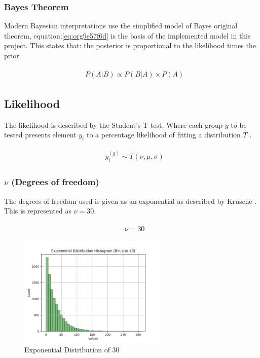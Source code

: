 \documentclass[11pt]{report}
\begin{document}
\subsubsection{Bayes Theorem}
\label{sec:orgf7b9113}

Modern Bayesian interpretations use the simplified model of Bayes original theorem, equation:\ref{eq:org9e57f6d} is the basis of the implemented model in this project. This states that: the posterior is proportional to the likelihood times the prior.

\begin{align}
\label{eq:org9e57f6d}
  &\begin{aligned}
  P(A|B) \propto P(B|A) \times P(A)
  \end{aligned}
\end{align}


\subsection{Likelihood}
\label{sec:org07bf29f}
The likelihood is described by the Student's T-test. Where each group \(g\) to be tested presents element \(y_i\) to a percentage likelihood of fitting a distribution \(T\) .

 \begin{align}
\label{eq:orgd0a9744}
   &\begin{aligned}
y_i^{(g)} \sim T(\nu, \mu, \sigma)
   \end{aligned}
 \end{align}

\subsubsection{\(\nu\) (Degrees of freedom)}
\label{sec:org0513a5e}
The degrees of freedom used is given as an exponential as described by
Krusche \cite{Kruschke2012}. This is represented as \(\nu = 30\).

 \begin{align}
\label{eq:orge06b86f}
   &\begin{aligned}
\nu = 30
   \end{aligned}
 \end{align}

\begin{figure}[htbp]
\centering
\includegraphics[width=7cm]{./images/dist2.png}
\caption{\label{fig:orgdf1d3df}
Exponential Distribution of 30}
\end{figure}
\end{document}
